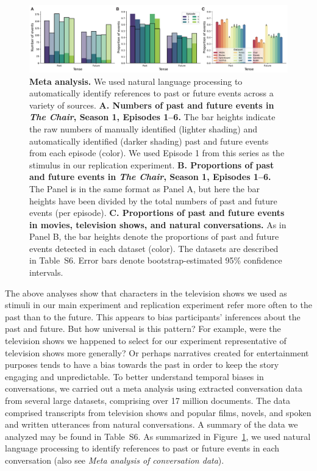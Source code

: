 \documentclass[10pt]{article}
\newcommand{\metaAnalysisDatasets}{S6}
\begin{document}
\begin{figure}[tp]
  \centering
  \includegraphics[width=\textwidth]{meta-analysis}

\caption{\textbf{Meta analysis.} We used natural language processing to automatically identify references to past or future events across a variety of sources. \textbf{A. Numbers of past and future events in \textit{The Chair}, Season 1, Episodes 1--6.} The bar heights indicate the raw numbers of manually identified (lighter shading) and automatically identified (darker shading) past and future events from each episode (color). We used Episode 1 from this series as the stimulus in our replication experiment. \textbf{B. Proportions of past and future events in \textit{The Chair}, Season 1, Episodes 1--6.} The Panel is in the same format as Panel A, but here the bar heights have been divided by the total numbers of past and future events (per episode). \textbf{C. Proportions of past and future events in movies, television shows, and natural conversations.} As in Panel B, the bar heights denote the proportions of past and future events detected in each dataset (color). The datasets are described in Table~\metaAnalysisDatasets. Error bars denote bootstrap-estimated 95\% confidence intervals.}
  
  \label{fig:meta-analysis}
\end{figure}

The above analyses show that characters in the television shows we used as stimuli in our main experiment and replication experiment refer more often to the past than to the future. This appears to bias participants' inferences about the past and future. But how universal is this pattern? For example, were the television shows we happened to select for our experiment representative of television shows more generally? Or perhaps narratives created for entertainment purposes tends to have a bias towards the past in order to keep the story engaging and unpredictable. To better understand temporal biases in conversations, we carried out a meta analysis using extracted conversation data from several large datasets, comprising over 17 million documents. The data comprised transcripts from television shows and popular films, novels, and spoken and written utterances from natural conversations. A summary of the data we analyzed may be found in Table~\metaAnalysisDatasets. As summarized in Figure~\ref{fig:meta-analysis}, we used natural language processing to identify references to past or future events in each conversation (also see \textit{Meta analysis of conversation data}).
\end{document}
